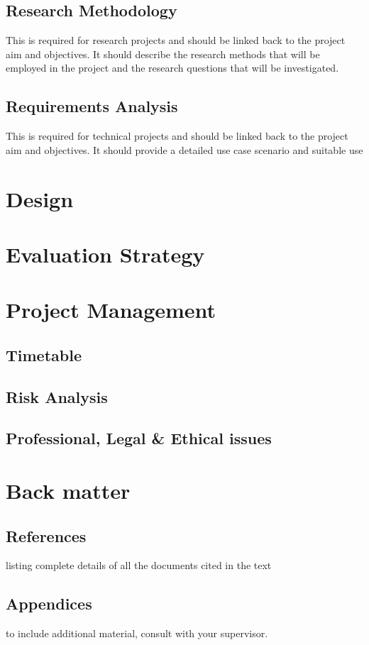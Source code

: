 \documentclass[11pt]{article}
\begin{document}
\subsection{Research Methodology}
This is required for research projects and should be linked
back to the project aim and objectives. It should describe the research methods that
will be employed in the project and the research questions that will be investigated.

\subsection{Requirements Analysis}
This is required for technical projects and should be linked
back to the project aim and objectives. It should provide a detailed use case scenario
and suitable use

\section{Design}

\section{Evaluation Strategy}

\section{Project Management}
\subsection{Timetable}

\subsection{Risk Analysis}

\subsection{Professional, Legal \& Ethical issues}

\section{Back matter}
\subsection{References}
listing complete details of all the documents cited in the text

\subsection{Appendices}
to include additional material, consult with your supervisor.
\end{document}
